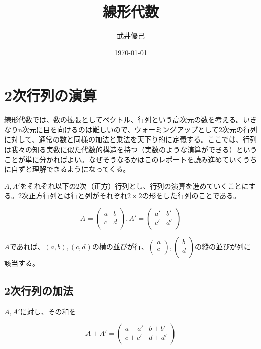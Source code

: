 \documentclass[dvipdfmx,autodetect-engine]{jsarticle}
\title{線形代数}
\author{武井優己}
\date{\today}
\begin{document}
\maketitle

\tableofcontents

\section{2次行列の演算}

線形代数では、数の拡張としてベクトル、行列という高次元の数を考える。いきなりn次元に目を向けるのは難しいので、ウォーミングアップとして2次元の行列に対して、通常の数と同様の加法と乗法を天下り的に定義する。ここでは、行列は我々の知る実数に似た代数的構造を持つ（実数のような演算ができる）ということが単に分かればよい。なぜそうなるかはこのレポートを読み進めていくうちに自ずと理解できるようになってくる。

$A, A'$をそれぞれ以下の2次（正方）行列とし、行列の演算を進めていくことにする。2次正方行列とは行と列がそれぞれ$2 \times 2$の形をした行列のことである。

$$
A = \begin{pmatrix}
a & b \\
c & d \\
\end{pmatrix},
A' = \begin{pmatrix}
a' & b' \\
c' & d' \\
\end{pmatrix}
$$

$A$であれば、$(a, b), (c, d)$の横の並びが行、$\begin{pmatrix}
a \\
c \\
\end{pmatrix}, \begin{pmatrix}
b \\
d \\
\end{pmatrix}$の縦の並びが列に該当する。


\subsection{2次行列の加法}

$A, A'$に対し、その和を

$$
A + A' = \begin{pmatrix}
a + a' & b + b' \\
c + c' & d + d'\\
\end{pmatrix}
$$
\end{document}
